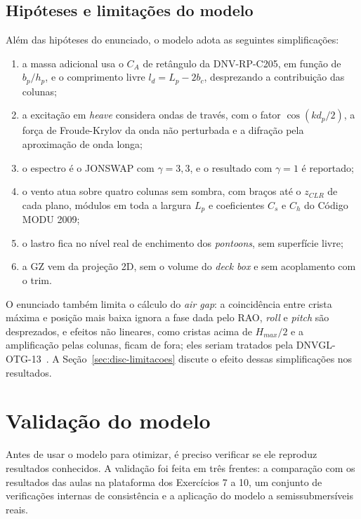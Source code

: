 \documentclass[11pt,a4paper]{article}
\begin{document}
\subsection{Hipóteses e limitações do modelo}\label{sec:hipoteses}

Além das hipóteses do enunciado, o modelo adota as seguintes simplificações:
\begin{enumerate}
\item a massa adicional usa o $C_A$ de retângulo da DNV-RP-C205, em função de $b_p/h_p$, e o
comprimento livre $l_d = L_p - 2b_c$, desprezando a contribuição das colunas;
\item a excitação em \emph{heave} considera ondas de través, com o fator $\cos(kd_p/2)$, a força de
Froude-Krylov da onda não perturbada e a difração pela aproximação de onda longa;
\item o espectro é o JONSWAP com $\gamma = 3{,}3$, e o resultado com $\gamma = 1$ é reportado;
\item o vento atua sobre quatro colunas sem sombra, com braços até o $z_{CLR}$ de cada plano,
módulos em toda a largura $L_p$ e coeficientes $C_s$ e $C_h$ do Código MODU 2009;
\item o lastro fica no nível real de enchimento dos \emph{pontoons}, sem superfície livre;
\item a GZ vem da projeção 2D, sem o volume do \emph{deck box} e sem acoplamento com o trim.
\end{enumerate}
O enunciado também limita o cálculo do \emph{air gap}: a coincidência entre crista máxima e posição
mais baixa ignora a fase dada pelo RAO, \emph{roll} e \emph{pitch} são desprezados, e efeitos não
lineares, como cristas acima de $H_{max}/2$ e a amplificação pelas colunas, ficam de fora; eles
seriam tratados pela DNVGL-OTG-13~\cite{otg13}. A Seção~\ref{sec:disc-limitacoes} discute o efeito
dessas simplificações nos resultados.


\section{Validação do modelo}\label{sec:validacao}

Antes de usar o modelo para otimizar, é preciso verificar se ele reproduz resultados conhecidos. A
validação foi feita em três frentes: a comparação com os resultados das aulas na plataforma dos
Exercícios 7 a 10, um conjunto de verificações internas de consistência e a aplicação do modelo a
semissubmersíveis reais.
\end{document}
